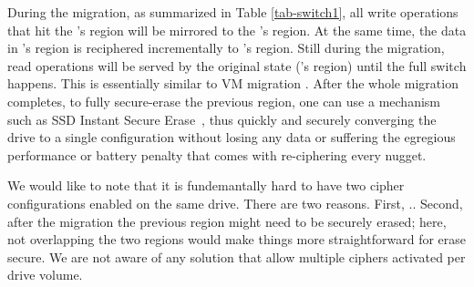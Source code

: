 
During the migration, as summarized in Table \ref{tab-switch1}, all write
operations that hit the \cone's region will be mirrored to the \ctwo's
region.  At the same time, the data in \cone's region is reciphered
incrementally to \ctwo's region.  Still during the migration, read
operations will be served by the original state (\cone's region) until the
full switch happens.  This is essentially similar to VM migration
\cite{google-live-vm-migration-nsdi}.  After the whole migration
completes, to fully secure-erase the previous region, one can use a
mechanism such as SSD Instant Secure Erase~\cite{ISE1,ISE2,ISE3}, thus
quickly and securely converging the drive to a single configuration
without losing any data or suffering the egregious performance or battery
penalty that comes with re-ciphering every nugget.

We would like to note that it is fundemantally hard to have two cipher
configurations enabled on the same drive.  There are two reasons.  First,
..  Second,
after the migration the previous region might need to be securely erased;
here, not overlapping the two regions would make things more
straightforward for erase secure.  We are not aware of any solution that
allow multiple ciphers activated per drive volume.







